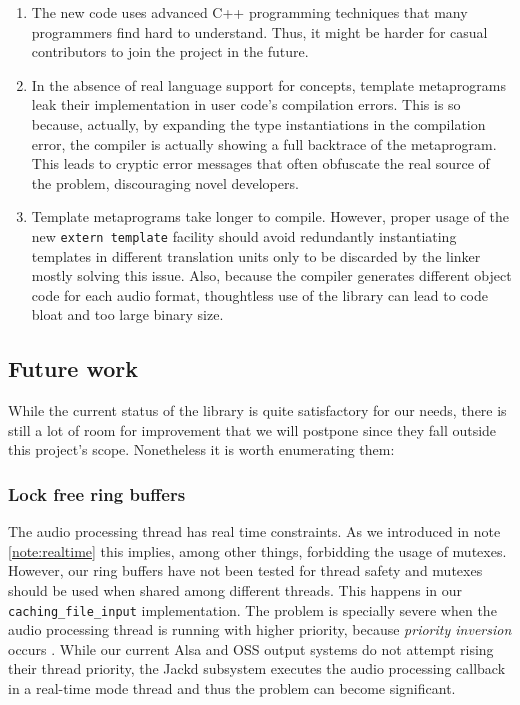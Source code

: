 \begin{enumerate}
\item The new code uses advanced C++ programming techniques that many
  programmers find hard to understand. Thus, it might be harder for
  casual contributors to join the project in the future.

\item In the absence of real language support for concepts, template
  metaprograms leak their implementation in user code's compilation
  errors. This is so because, actually, by expanding the type
  instantiations in the compilation error, the compiler is actually
  showing a full backtrace of the metaprogram. This leads to cryptic
  error messages that often obfuscate the real source of the problem,
  discouraging novel developers.

\item Template metaprograms take longer to compile. However, proper
  usage of the new \texttt{extern template} facility should avoid
  redundantly instantiating templates in different translation units
  only to be discarded by the linker mostly solving this issue. Also,
  because the compiler generates different object code for each audio
  format, thoughtless use of the library can lead to code bloat and
  too large binary size.
\end{enumerate}

\subsection{Future work}

While the current status of the library is quite satisfactory for our
needs, there is still a lot of room for improvement that we will
postpone since they fall outside this project's scope. Nonetheless it
is worth enumerating them:

\subsubsection{Lock free ring buffers}
\label{sec:fixringbuffer}

The audio processing thread has real time constraints. As we
introduced in note \ref{note:realtime} this implies, among other
things, forbidding the usage of mutexes. However, our ring buffers
have not been tested for thread safety and mutexes should be used when
shared among different threads. This happens in our
\texttt{caching\_file\_input} implementation. The problem is specially
severe when the audio processing thread is running with higher priority,
because \emph{priority inversion} occurs \cite{kim03basic}. While our
current Alsa and OSS output systems do not attempt rising their thread
priority, the Jackd subsystem executes the audio processing callback
in a real-time mode thread and thus the problem can become significant.

